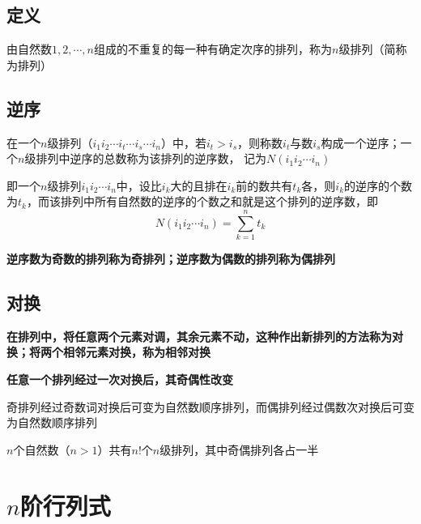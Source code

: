\documentclass[UTF8]{ctexart}
\newcommand{\emplin}{\vspace{1em}}
\begin{document}
\subsection*{定义}
由自然数$1,2,\cdots,n$组成的不重复的每一种有确定次序的排列，称为$n$级排列（简称为排列）

\subsection*{逆序}
在一个$n$级排列（$i_1i_2\cdots i_t\cdots i_s\cdots i_n$）中，若$i_t>i_s$，则称数$i_t$与数$i_s$构成一个逆序；一个$n$级排列中逆序的总数称为该排列的逆序数，
记为$N(i_1i_2\cdots i_n)$

即一个$n$级排列$i_1i_2\cdots i_n$中，设比$i_k$大的且排在$i_k$前的数共有$t_k$各，则$i_k$的逆序的个数为$t_k$，而该排列中所有自然数的逆序的个数之和就是这个排列的逆序数，即
\[N(i_1i_2\cdots i_n)=\sum_{k=1}^nt_k\]

\emplin

\textbf{逆序数为奇数的排列称为奇排列；逆序数为偶数的排列称为偶排列}

\subsection*{对换}

\textbf{在排列中，将任意两个元素对调，其余元素不动，这种作出新排列的方法称为对换；将两个相邻元素对换，称为相邻对换}

\emplin

\textbf{任意一个排列经过一次对换后，其奇偶性改变}

\emplin

奇排列经过奇数词对换后可变为自然数顺序排列，而偶排列经过偶数次对换后可变为自然数顺序排列

$n$个自然数（$n>1$）共有$n!$个$n$级排列，其中奇偶排列各占一半

\section*{$n$阶行列式}
\end{document}
